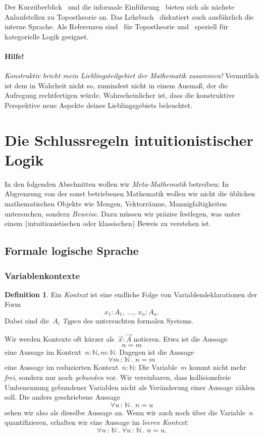 \documentclass[a4paper,ngerman,12pt]{scrartcl}
\theoremstyle{definition}
\newtheorem{defn}{Definition}[section]
\theoremstyle{plain}
\theoremstyle{remark}
\newcommand{\NN}{\mathbb{N}}
\renewcommand{\_}{\mathpunct{.}\,}
\newcommand{\?}{\,{:}\,}
\begin{document}
Der Kurzüberblick~\cite{baez:topos} und die informale
Einführung~\cite{leinster:topos} bieten sich als nächste Anlaufstellen zu
Topostheorie an.
Das Lehrbuch~\cite{moerdijk:maclane:sheaves} diskutiert auch ausführlich die
interne Sprache. Als Referenzen sind~\cite{johnstone:elephant} für Topostheorie
und~\cite{lambek:scott:hocatlogic} speziell für kategorielle Logik geeignet.


\paragraph{Hilfe!} \emph{Konstruktiv bricht mein Lieblingsteilgebiet der
Mathematik zusammen!} Vermutlich ist dem in Wahrheit nicht so, zumindest nicht
in einem Ausmaß, der die Aufregung rechtfertigen würde.  Wahrscheinlicher ist,
dass die konstruktive Perspektive neue Aspekte deines Lieblingsgebiets
beleuchtet.


\section{Die Schlussregeln intuitionistischer Logik}

\label{section:schlussregeln}%
In den folgenden Abschnitten wollen wir \emph{Meta-Mathematik} betreiben: In
Abgrenzung von der sonst betriebenen Mathematik wollen wir nicht die üblichen
mathematischen Objekte wie Mengen, Vektorräume, Mannigfaltigkeiten untersuchen,
sondern \emph{Beweise}. Dazu müssen wir präzise festlegen, was unter einem
(intuitionistischen oder klassischen) Beweis zu verstehen ist.


\subsection{Formale logische Sprache}

\subsubsection*{Variablenkontexte}

\begin{defn}Ein \emph{Kontext} ist eine endliche Folge von
Variablendeklarationen der Form
\[ x_1 : A_1,\ \ldots,\ x_n : A_n. \]
Dabei sind die~$A_i$ \emph{Typen} des untersuchten formalen Systems.\end{defn}

Wir werden Kontexte oft kürzer als~$\vec x : \vec A$ notieren. Etwa ist die
Aussage
\[ n = m \]
eine Aussage im Kontext~$n : \NN, m : \NN$. Dagegen ist die Aussage
\[ \forall m\?\NN\_ n = m \]
eine Aussage im reduzierten Kontext~$n : \NN$: Die Variable~$m$ kommt
nicht mehr \emph{frei}, sondern nur noch \emph{gebunden} vor. Wir vereinbaren,
dass kollisionsfreie Umbenennung gebundener Variablen nicht als Veränderung
einer Aussage zählen soll. Die anders geschriebene Aussage
\[ \forall u\?\NN\_ n = u \]
sehen wir also als dieselbe Aussage an.
Wenn wir auch noch über die
Variable~$n$ quantifizieren, erhalten wir eine Aussage im \emph{leeren Kontext}:
\[ \forall n\?\NN\_ \forall u\?\NN\_ n = u. \]
\end{document}
